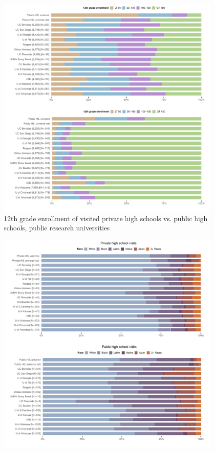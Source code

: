 \documentclass[
  12pt,
]{article}
\begin{document}
\begin{landscape}
\begin{figure}
{\centering \includegraphics[width=2\linewidth]{../assets/figures/ego_network_enroll_pubu_privhs_pubhs} 

}

\caption{12th grade enrollment of visited private high schools vs. public high schools, public research universities}\label{fig:enroll-pubu-privhs-pubhs}
\end{figure}

\newpage

\begin{figure}

{\centering \includegraphics[width=2\linewidth]{../assets/figures/south_race_comp_pubu_privhs_pubhs} 

}
\end{figure}
\end{landscape}
\end{document}
